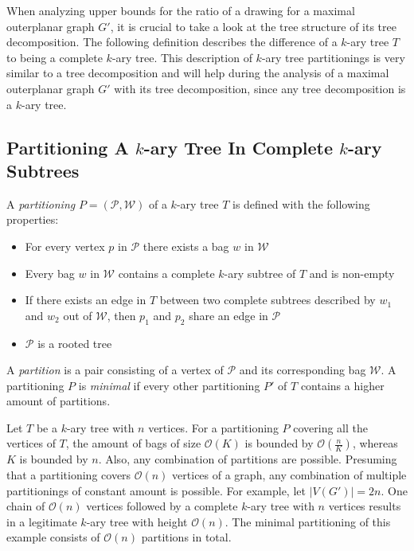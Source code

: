 When analyzing upper bounds for the ratio of a drawing for a maximal outerplanar graph $G'$, it is crucial to take a look at the tree structure of its tree decomposition. The following definition describes the difference of a $k$-ary tree $T$ to being a complete $k$-ary tree. This description of $k$-ary tree partitionings is very similar to a tree decomposition and will help during the analysis of a maximal outerplanar graph $G'$ with its tree decomposition, since any tree decomposition is a $k$-ary tree.
\subsection{Partitioning A $k$-ary Tree In Complete $k$-ary Subtrees}
\begin{definition}
	A \emph{partitioning} $P = (\mathcal{P},\mathcal{W})$ of a $k$-ary tree $T$ is defined with the following properties:
	\begin{itemize}
		\item For every vertex $p$ in $\mathcal{P}$ there exists a bag $w$ in $\mathcal{W}$
		\item Every bag $w$ in $\mathcal{W}$ contains a complete $k$-ary subtree of $T$ and is non-empty
		\item If there exists an edge in $T$ between two complete subtrees described by $w_1$ and $w_2$ out of $\mathcal{W}$, then $p_1$ and $p_2$ share an edge in $\mathcal{P}$
		\item $\mathcal{P}$ is a rooted tree		
	\end{itemize}
	A \emph{partition} is a pair consisting of a vertex of $\mathcal{P}$ and its corresponding bag $\mathcal{W}$. A partitioning $P$ is \emph{minimal} if every other partitioning $P'$ of $T$ contains a higher amount of partitions.
\end{definition}
Let $T$ be a $k$-ary tree with $n$ vertices. For a partitioning $P$ covering all the vertices of $T$, the amount of bags of size $\mathcal{O}(K)$ is bounded by $\mathcal{O}(\frac{n}{K})$, whereas $K$ is bounded by $n$. Also, any combination of partitions are possible. Presuming that a partitioning covers $\mathcal{O}(n)$ vertices of a graph, any combination of multiple partitionings of constant amount is possible. For example, let $|V(G')| = 2n$. One chain of $\mathcal{O}(n)$ vertices followed by a complete $k$-ary tree with $n$ vertices results in a legitimate $k$-ary tree with height $\mathcal{O}(n)$. The minimal partitioning of this example consists of $\mathcal{O}(n)$ partitions in total.

